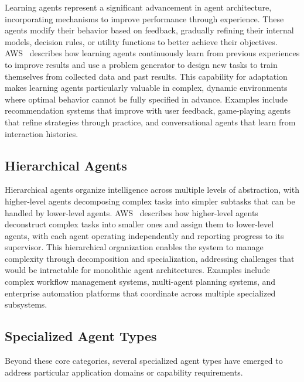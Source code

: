 Learning agents represent a significant advancement in agent architecture, incorporating mechanisms to improve performance through experience. These agents modify their behavior based on feedback, gradually refining their internal models, decision rules, or utility functions to better achieve their objectives. AWS~\cite{aws2024learningagents} describes how learning agents continuously learn from previous experiences to improve results and use a problem generator to design new tasks to train themselves from collected data and past results. This capability for adaptation makes learning agents particularly valuable in complex, dynamic environments where optimal behavior cannot be fully specified in advance. Examples include recommendation systems that improve with user feedback, game-playing agents that refine strategies through practice, and conversational agents that learn from interaction histories.


\subsection{Hierarchical Agents}

Hierarchical agents organize intelligence across multiple levels of abstraction, with higher-level agents decomposing complex tasks into simpler subtasks that can be handled by lower-level agents. AWS~\cite{aws2024hierarchicalagents} describes how higher-level agents deconstruct complex tasks into smaller ones and assign them to lower-level agents, with each agent operating independently and reporting progress to its supervisor. This hierarchical organization enables the system to manage complexity through decomposition and specialization, addressing challenges that would be intractable for monolithic agent architectures. Examples include complex workflow management systems, multi-agent planning systems, and enterprise automation platforms that coordinate across multiple specialized subsystems.


\subsection{Specialized Agent Types}

Beyond these core categories, several specialized agent types have emerged to address particular application domains or capability requirements. 

